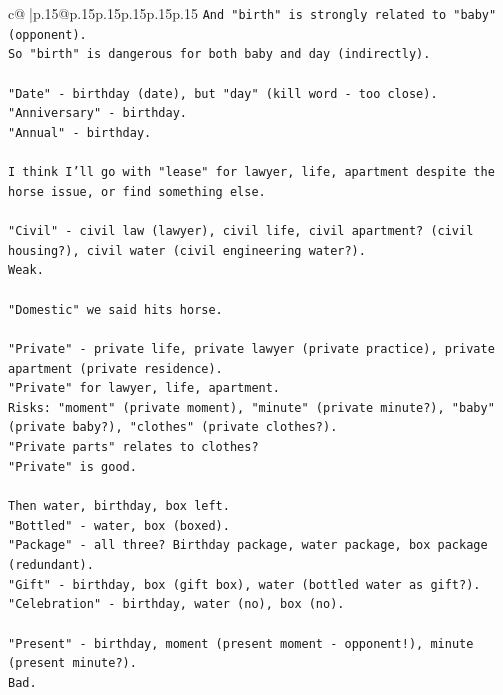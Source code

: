 \documentclass{article}
\begin{document}
{\begin{supertabular}{c@{$\;$}|p{.15\linewidth}@{}p{.15\linewidth}p{.15\linewidth}p{.15\linewidth}p{.15\linewidth}p{.15\linewidth}}
{{{\texttt{And "birth" is strongly related to "baby" (opponent).} \\
\texttt{So "birth" is dangerous for both baby and day (indirectly).} \\
\\ 
\texttt{"Date" {-} birthday (date), but "day" (kill word {-} too close).} \\
\texttt{"Anniversary" {-} birthday.} \\
\texttt{"Annual" {-} birthday.} \\
\\ 
\texttt{I think I'll go with "lease" for lawyer, life, apartment despite the horse issue, or find something else.} \\
\\ 
\texttt{"Civil" {-} civil law (lawyer), civil life, civil apartment? (civil housing?), civil water (civil engineering water?).} \\
\texttt{Weak.} \\
\\ 
\texttt{"Domestic" we said hits horse.} \\
\\ 
\texttt{"Private" {-} private life, private lawyer (private practice), private apartment (private residence).} \\
\texttt{"Private" for lawyer, life, apartment.} \\
\texttt{Risks: "moment" (private moment), "minute" (private minute?), "baby" (private baby?), "clothes" (private clothes?).} \\
\texttt{"Private parts" relates to clothes?} \\
\texttt{"Private" is good.} \\
\\ 
\texttt{Then water, birthday, box left.} \\
\texttt{"Bottled" {-} water, box (boxed).} \\
\texttt{"Package" {-} all three? Birthday package, water package, box package (redundant).} \\
\texttt{"Gift" {-} birthday, box (gift box), water (bottled water as gift?).} \\
\texttt{"Celebration" {-} birthday, water (no), box (no).} \\
\\ 
\texttt{"Present" {-} birthday, moment (present moment {-} opponent!), minute (present minute?).} \\
\texttt{Bad.} \\
\\ 
}}}
\end{supertabular}}
\end{document}
